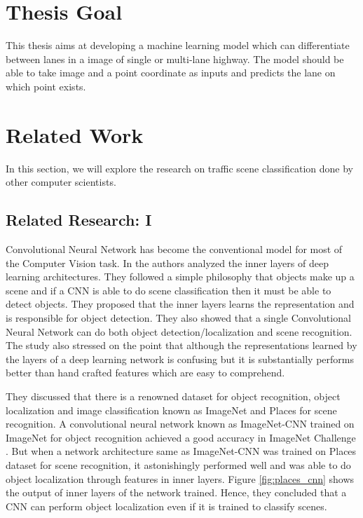 \section{Thesis Goal}
This thesis aims at developing a machine learning model which can differentiate between lanes in a image of single or multi-lane highway. The model should be able to take image and a point coordinate as inputs and predicts the lane on which point exists.
\section{Related Work}
In this section, we will explore the research on traffic scene classification done by other computer scientists.
\subsection{Related Research: I}
\par
Convolutional Neural Network has become the conventional model for most of the Computer Vision task. In \cite{zhou2014object} the authors analyzed the inner layers of deep learning architectures. They followed a simple philosophy that objects make up a scene and if a CNN is able to do scene classification then it must be able to detect objects. They proposed that the inner layers learns the representation and is responsible for object detection. They also showed that a single Convolutional Neural Network can do both object detection/localization and scene recognition. The study also stressed on the point that although the representations learned by the layers of a deep learning network is confusing but it is substantially performs better than hand crafted features which are easy to comprehend.
\par
They discussed that there is a renowned dataset for object recognition, object localization and image classification known as ImageNet \cite{deng2009imagenet} and Places \cite{zhou2017places} for scene recognition. A convolutional neural network known as ImageNet-CNN \cite{donahue2014decaf} trained on ImageNet for object recognition achieved a good accuracy in ImageNet Challenge \cite{Russakovsky2015}. But when a network architecture same as ImageNet-CNN was trained on Places dataset for scene recognition, it astonishingly performed well and was able to do object localization through features in inner layers. Figure \ref{fig:places_cnn} shows the output of inner layers of the network trained. Hence, they concluded that a CNN can perform object localization even if it is trained to classify scenes.

